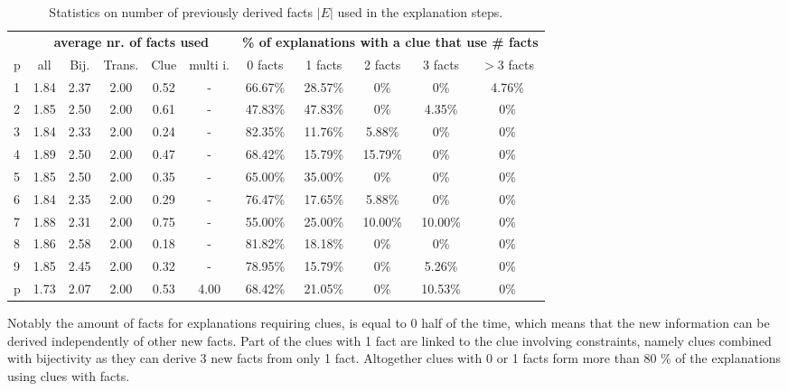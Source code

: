 \begin{table}[t]
	\centering
	\begin{tabular}{l|c|cccc|ccccc}
		& \multicolumn{5}{c|}{\bf average nr. of facts used} & \multicolumn{5}{c}{\bf \% of explanations with a clue that use \# facts}                                                                                \\
		p & all &  Bij. & Trans. &  Clue & multi i. & 0 facts & 1 facts & 2 facts & 3 facts & $>$3 facts \\\hline
		1 &  1.84 &  2.37 &   2.00 &  0.52 &        - &  66.67\% &  28.57\% &   0\% &   0\% &    4.76\% \\
		2 &  1.85 &  2.50 &   2.00 &  0.61 &        - &  47.83\% &  47.83\% &   0\% &   4.35\% &    0\% \\
		3 &  1.84 &  2.33 &   2.00 &  0.24 &        - &  82.35\% &  11.76\% &   5.88\% &   0\% &    0\% \\
		4 &  1.89 &  2.50 &   2.00 &  0.47 &        - &  68.42\% &  15.79\% &  15.79\% &   0\% &    0\% \\
		5 &  1.85 &  2.50 &   2.00 &  0.35 &        - &  65.00\% &  35.00\% &   0\% &   0\% &    0\% \\
		6 &  1.84 &  2.35 &   2.00 &  0.29 &        - &  76.47\% &  17.65\% &   5.88\% &   0\% &    0\% \\
		7 &  1.88 &  2.31 &   2.00 &  0.75 &        - &  55.00\% &  25.00\% &  10.00\% &  10.00\% &    0\% \\
		8 &  1.86 &  2.58 &   2.00 &  0.18 &        - &  81.82\% &  18.18\% &   0\% &   0\% &    0\% \\
		9 &  1.85 &  2.45 &   2.00 &  0.32 &        - &  78.95\% &  15.79\% &   0\% &   5.26\% &    0\% \\
		p &  1.73 &  2.07 &   2.00 &  0.53 &     4.00 &  68.42\% &  21.05\% &   0\% &  10.53\% &    0\% \\
	\end{tabular}
	\caption{Statistics on number of previously derived facts $|E|$ used in the explanation steps.
	}
	\label{table:sequence_level}
\end{table}


Notably the amount of facts for explanations requiring clues, is equal to 0 half of the time, which means that the new information can 
be derived independently of other new facts. 
Part of the clues with 1 fact are linked to the clue involving constraints, namely clues combined with bijectivity as they can derive  3 new facts from only 1 fact.
Altogether clues with 0 or 1 facts form more than 80 \% of the explanations using clues with facts. 

